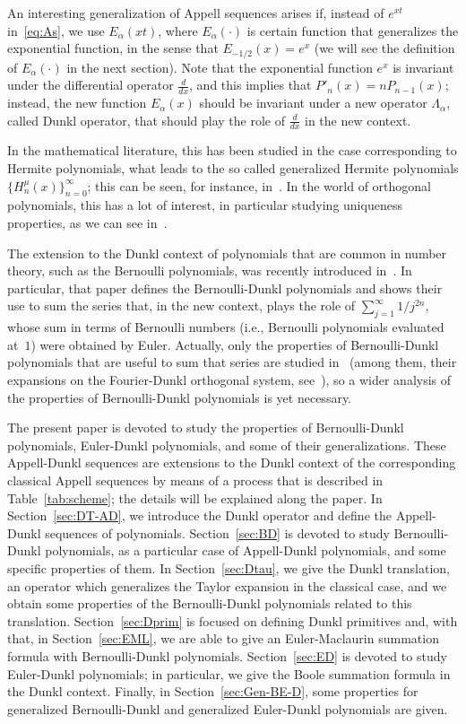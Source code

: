 \documentclass[10pt]{article}
\theoremstyle{plain}
\theoremstyle{definition}
\numberwithin{equation}{section} %
\newcommand{\Ea}{E_{\alpha}}
\newcommand{\La}{\Lambda_{\alpha}}
\begin{document}
An interesting generalization of Appell sequences arises if, instead of $e^{xt}$ in~\eqref{eq:As}, we use $\Ea(xt)$, where $\Ea(\cdot)$ is certain function that generalizes the exponential function, in the sense that $E_{-1/2}(x) = e^x$ (we will see the definition of $\Ea(\cdot)$ in the next section). Note that the exponential function $e^x$ is invariant under the differential operator $\frac{d}{dx}$, and this implies that $P'_n(x) = nP_{n-1}(x)$; instead, the new function $\Ea(x)$ should be invariant under a new operator $\La$, called Dunkl operator, that should play the role of $\frac{d}{dx}$ in the new context.

In the mathematical literature, this has been studied in the case corresponding to Hermite polynomials, what leads to the so called generalized Hermite polynomials $\{H_n^\mu(x)\}_{n=0}^{\infty}$; this can be seen, for instance, in~\cite{Ros}. In the world of orthogonal polynomials, this has a lot of interest, in particular studying uniqueness properties, as we can see in~\cite{AlS}.

The extension to the Dunkl context of polynomials that are common in number theory, such as the Bernoulli polynomials, was recently introduced in~\cite{CDPV}.
In particular, that paper defines the Bernoulli-Dunkl polynomials and shows their use to sum the series that, in the new context, plays the role of $\sum_{j=1}^{\infty} 1/j^{2n}$, whose sum in terms of Bernoulli numbers (i.e., Bernoulli polynomials evaluated at~$1$) were obtained by Euler. Actually, only the properties of Bernoulli-Dunkl polynomials that are useful to sum that series are studied in~\cite{CDPV} (among them, their expansions on the Fourier-Dunkl orthogonal system, see~\cite{CPRV,CV}), so a wider analysis of the properties of Bernoulli-Dunkl polynomials is yet necessary.

The present paper is devoted to study the properties of Bernoulli-Dunkl polynomials, Euler-Dunkl polynomials, and some of their generalizations. These Appell-Dunkl sequences are extensions to the Dunkl context of the corresponding classical Appell sequences by means of a process that is described in Table~\ref{tab:scheme}; the details will be explained along the paper.
In Section~\ref{sec:DT-AD}, we introduce the Dunkl operator and define the Appell-Dunkl sequences of polynomials. Section~\ref{sec:BD} is devoted to study Bernoulli-Dunkl polynomials, as a particular case of Appell-Dunkl polynomials, and some specific properties of them. In Section~\ref{sec:Dtau}, we give the Dunkl translation, an operator which generalizes the Taylor expansion in the classical case, and we obtain some properties of the Bernoulli-Dunkl polynomials related to this translation. Section~\ref{sec:Dprim} is focused on defining Dunkl primitives and, with that, in Section~\ref{sec:EML}, we are able to give an Euler-Maclaurin summation formula with Bernoulli-Dunkl polynomials. Section~\ref{sec:ED} is devoted to study Euler-Dunkl polynomials; in particular, we give the Boole summation formula in the Dunkl context. Finally, in Section~\ref{sec:Gen-BE-D}, some properties for generalized Bernoulli-Dunkl and generalized Euler-Dunkl polynomials are given.
\end{document}
